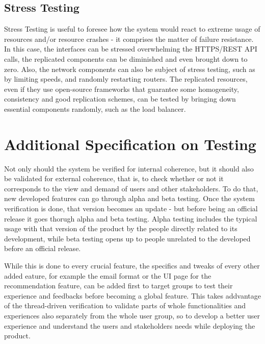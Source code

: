 \subsection{Stress Testing}
Stress Testing is useful to foresee how the system would react to extreme usage of resources and/or resource crashes - it comprises the matter of failure resistance. In this case, the interfaces can be stressed overwhelming the HTTPS/REST API calls, the replicated components can be diminished and even brought down to zero. Also, the network components can also be subject of stress testing, such as by limiting speeds, and randomly restarting routers. The replicated resources, even if they use open-source frameworks that guarantee some homogeneity, consistency and good replication schemes, can be tested by bringing down essential components randomly, such as the load balancer.
\section{Additional Specification on Testing}
Not only should the system be verified for internal coherence, but it should also be validated for external coherence, that is, to check whether or not it corresponds to the view and demand of users and other stakeholders. To do that, new developed features can go through alpha and beta testing. Once the system verification is done, that version becomes an update - but before being an official release it goes thorugh alpha and beta testing. Alpha testing includes the typical usage with that version of the product by the people directly related to its development, while beta testing opens up to people unrelated to the developed before an official release. 

While this is done to every crucial feature, the specifics and tweaks of every other added eature, for example the email format or the UI page for the recommendation feature, can be added first to target groups to test their experience and feedbacks before becoming a global feature. This takes addvantage of the thread-driven verification to validate parts of whole functionalities and experiences also separately from the whole user group, so to develop a better user experience and understand the users and stakeholders needs while deploying the product.